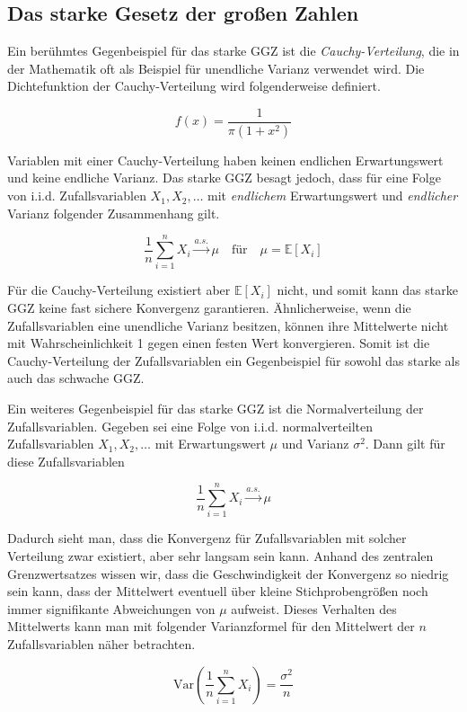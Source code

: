 \documentclass[12pt,a4paper]{article}
\begin{document}
\subsection{Das starke Gesetz der großen Zahlen}


Ein berühmtes Gegenbeispiel für das starke GGZ ist die \textit{Cauchy-Verteilung}, die in der Mathematik oft als Beispiel für unendliche Varianz verwendet wird. Die Dichtefunktion der Cauchy-Verteilung wird folgenderweise definiert.

\[
f(x) = \frac{1}{\pi (1 + x^2)}
\]

Variablen mit einer Cauchy-Verteilung haben keinen endlichen Erwartungswert und keine endliche Varianz.
Das starke GGZ besagt jedoch, dass für eine Folge von i.i.d. Zufallsvariablen \( X_1, X_2, \dots \) mit \textit{endlichem} Erwartungswert und \textit{endlicher} Varianz folgender Zusammenhang gilt.

\[
\frac{1}{n} \sum_{i=1}^n X_i \xrightarrow{a.s.} \mu \quad \text{für} \quad \mu = \mathbb{E}[X_i]
\]

Für die Cauchy-Verteilung existiert aber \(\mathbb{E}[X_i]\) nicht, und somit kann das starke GGZ keine fast sichere Konvergenz garantieren.
Ähnlicherweise, wenn die Zufallsvariablen eine unendliche Varianz besitzen, können ihre Mittelwerte nicht mit Wahrscheinlichkeit 1 gegen einen festen Wert konvergieren.
Somit ist die Cauchy-Verteilung der Zufallsvariablen ein Gegenbeispiel für sowohl das starke als auch das schwache GGZ.


Ein weiteres Gegenbeispiel für das starke GGZ ist die Normalverteilung der Zufallsvariablen. Gegeben sei eine Folge von i.i.d. normalverteilten Zufallsvariablen \( X_1, X_2, \dots \) mit Erwartungswert \(\mu\) und Varianz \(\sigma^2\). Dann gilt für diese Zufallsvariablen

\[
\frac{1}{n} \sum_{i=1}^n X_i \xrightarrow{a.s.} \mu
\]

Dadurch sieht man, dass die Konvergenz für Zufallsvariablen mit solcher Verteilung zwar existiert, aber sehr langsam sein kann.
Anhand des zentralen Grenzwertsatzes wissen wir, dass die Geschwindigkeit der Konvergenz so niedrig sein kann, dass der Mittelwert eventuell über kleine Stichprobengrößen noch immer signifikante Abweichungen von \(\mu\) aufweist.
Dieses Verhalten des Mittelwerts kann man mit folgender Varianzformel für den Mittelwert der \(n\) Zufallsvariablen näher betrachten.

\[
\text{Var}\left( \frac{1}{n} \sum_{i=1}^n X_i \right) = \frac{\sigma^2}{n}
\]
\end{document}
